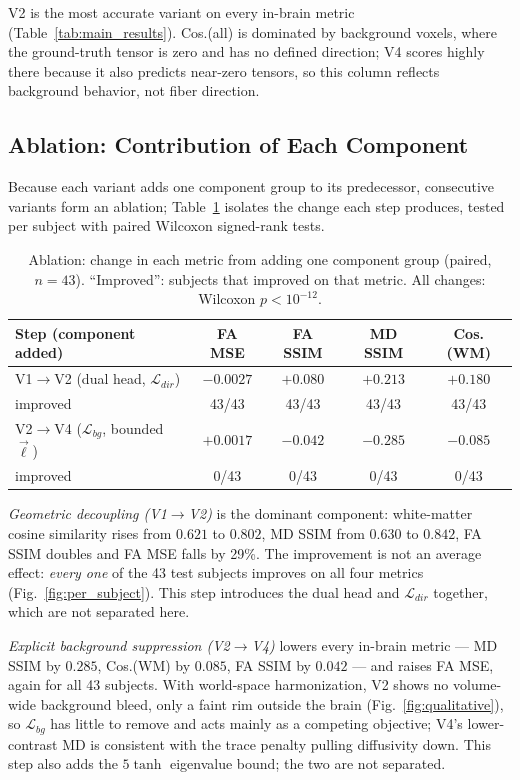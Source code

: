 \documentclass[conference,compsoc]{IEEEtran}
\begin{document}
V2 is the most accurate variant on every in-brain metric (Table~\ref{tab:main_results}). Cos.(all) is dominated by background voxels, where the ground-truth tensor is zero and has no defined direction; V4 scores highly there because it also predicts near-zero tensors, so this column reflects background behavior, not fiber direction.

\subsection{Ablation: Contribution of Each Component}
\label{sec:ablation}
Because each variant adds one component group to its predecessor, consecutive variants form an ablation; Table~\ref{tab:ablation} isolates the change each step produces, tested per subject with paired Wilcoxon signed-rank tests.

\begin{table}[t]
\centering
\footnotesize
\setlength{\tabcolsep}{2.0pt}
\caption{Ablation: change in each metric from adding one component group (paired, $n=43$). ``Improved'': subjects that improved on that metric. All changes: Wilcoxon $p<10^{-12}$.}
\label{tab:ablation}
\begin{tabular}{lcccc}
\toprule
\textbf{Step (component added)} & \textbf{FA MSE} & \textbf{FA SSIM} & \textbf{MD SSIM} & \textbf{Cos.(WM)} \\
\midrule
V1$\to$V2 (dual head, $\mathcal{L}_{dir}$) & $-0.0027$ & $+0.080$ & $+0.213$ & $+0.180$ \\
\quad improved & 43/43 & 43/43 & 43/43 & 43/43 \\
V2$\to$V4 ($\mathcal{L}_{bg}$, bounded $\vec\ell$) & $+0.0017$ & $-0.042$ & $-0.285$ & $-0.085$ \\
\quad improved & 0/43 & 0/43 & 0/43 & 0/43 \\
\bottomrule
\end{tabular}
\end{table}

\textit{Geometric decoupling (V1$\to$V2)} is the dominant component: white-matter cosine similarity rises from $0.621$ to $0.802$, MD SSIM from $0.630$ to $0.842$, FA SSIM doubles and FA MSE falls by 29\%. The improvement is not an average effect: \emph{every one} of the 43 test subjects improves on all four metrics (Fig.~\ref{fig:per_subject}). This step introduces the dual head and $\mathcal{L}_{dir}$ together, which are not separated here.

\textit{Explicit background suppression (V2$\to$V4)} lowers every in-brain metric --- MD SSIM by $0.285$, Cos.(WM) by $0.085$, FA SSIM by $0.042$ --- and raises FA MSE, again for all 43 subjects. With world-space harmonization, V2 shows no volume-wide background bleed, only a faint rim outside the brain (Fig.~\ref{fig:qualitative}), so $\mathcal{L}_{bg}$ has little to remove and acts mainly as a competing objective; V4's lower-contrast MD is consistent with the trace penalty pulling diffusivity down. This step also adds the $5\tanh$ eigenvalue bound; the two are not separated.
\end{document}
